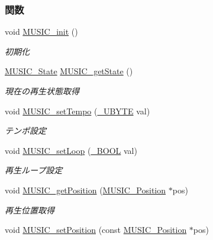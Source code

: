 \subsubsection*{関数}
\begin{DoxyCompactItemize}
\item 
void \hyperlink{music_8h_a238be89109438967c9e64f56401e0a8c_a238be89109438967c9e64f56401e0a8c}{M\+U\+S\+I\+C\+\_\+init} ()
\begin{DoxyCompactList}\small\item\em 初期化 \end{DoxyCompactList}\item 
\hyperlink{music_8h_a44fb51174ff72905a037ea2b766dc041_a44fb51174ff72905a037ea2b766dc041}{M\+U\+S\+I\+C\+\_\+\+State} \hyperlink{music_8h_a513969bbe9e0541a9712758cce80bd21_a513969bbe9e0541a9712758cce80bd21}{M\+U\+S\+I\+C\+\_\+get\+State} ()
\begin{DoxyCompactList}\small\item\em 現在の再生状態取得 \end{DoxyCompactList}\item 
void \hyperlink{music_8h_a372f19fae5dda083a8c38a9ad270f1fe_a372f19fae5dda083a8c38a9ad270f1fe}{M\+U\+S\+I\+C\+\_\+set\+Tempo} (\hyperlink{stddef_8h_aac464b47452ce9406f88ef194e2becc1_aac464b47452ce9406f88ef194e2becc1}{\+\_\+\+U\+B\+Y\+T\+E} val)
\begin{DoxyCompactList}\small\item\em テンポ設定 \end{DoxyCompactList}\item 
void \hyperlink{music_8h_a1792d32ccccbe2360cf76dd7dee0bb71_a1792d32ccccbe2360cf76dd7dee0bb71}{M\+U\+S\+I\+C\+\_\+set\+Loop} (\hyperlink{stddef_8h_afbf708854fe02af8475a9ba02f3196cb_afbf708854fe02af8475a9ba02f3196cb}{\+\_\+\+B\+O\+O\+L} val)
\begin{DoxyCompactList}\small\item\em 再生ループ設定 \end{DoxyCompactList}\item 
void \hyperlink{music_8h_ac74db7eae65c95911016d6a2b7673536_ac74db7eae65c95911016d6a2b7673536}{M\+U\+S\+I\+C\+\_\+get\+Position} (\hyperlink{music_8h_dd/d9f/structMUSIC__Position}{M\+U\+S\+I\+C\+\_\+\+Position} $\ast$pos)
\begin{DoxyCompactList}\small\item\em 再生位置取得 \end{DoxyCompactList}\item 
void \hyperlink{music_8h_a49f47cd07af4fdaa38f5c23c835f2db1_a49f47cd07af4fdaa38f5c23c835f2db1}{M\+U\+S\+I\+C\+\_\+set\+Position} (const \hyperlink{music_8h_dd/d9f/structMUSIC__Position}{M\+U\+S\+I\+C\+\_\+\+Position} $\ast$pos)

\end{DoxyCompactItemize}
